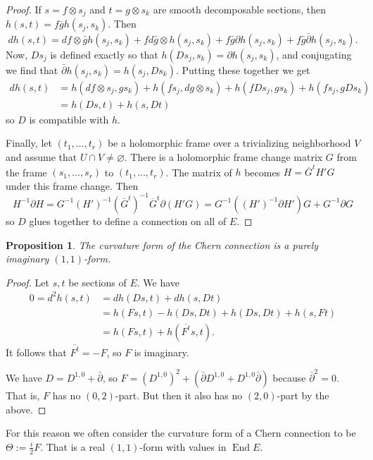 \documentclass[11pt]{article}
\newtheorem{prop}[theo]{Proposition}
\theoremstyle{definition}
\DeclareMathOperator{\End}{End}
\begin{document}
\begin{proof}
If $s = f \otimes s_j$ and $t = g \otimes s_k$ are smooth decomposable sections, then $h(s,t) = f\overline{g} h(s_j,s_k)$. Then
$$
d h(s,t)
= df \otimes \bar g h(s_j,s_k)
+ f d\bar g \otimes h(s_j,s_k)
+ f\bar g\partial h(s_j,s_k)
+ f\bar g\bar\partial h(s_j,s_k).
$$
Now, $Ds_j$ is defined exactly so that $h(Ds_j, s_k) = \partial h(s_j,s_k)$, and conjugating we find that $\bar\partial h(s_j,s_k) = h(s_j, D s_k)$. Putting these together we get
\begin{align*}
d h(s,t)
&= h(df \otimes s_j, g s_k)
+ h(f s_j, d g \otimes s_k)
+ h(f D s_j,g s_k)
+ h(f s_j,g D s_k)
\\
&= h(Ds, t) + h(s, Dt)
\end{align*}
so $D$ is compatible with $h$.

Finally, let $(t_1, \ldots, t_r)$ be a holomorphic frame over a trivializing neighborhood $V$ and assume that $U \cap V \not= \varnothing$. There is a holomorphic frame change matrix $G$ from the frame $(s_1, \ldots, s_r)$ to $(t_1,\ldots,t_r)$. The matrix of $h$ becomes $H = \overline{G}^{t}H'G$ under this frame change. Then
$$
H^{-1} \partial H
= G^{-1} (H')^{-1} (\overline G^t)^{-1} \overline G^t \partial(H'G)
= G^{-1} ((H')^{-1} \partial H') G + G^{-1} \partial G
$$
so $D$ glues together to define a connection on all of $E$.
\end{proof}


\begin{prop}
The curvature form of the Chern connection is a purely imaginary $(1,1)$-form.
\end{prop}

\begin{proof}
Let $s, t$ be sections of $E$. We have
\begin{align*}
0
= d^2 h(s, t)
&= d h(Ds, t) + d h(s, Dt)
\\
&= h(F s, t) - h(Ds, Dt) + h(Ds, Dt) + h(s, F t)
\\
&=
h(Fs,t) + h(\overline{F^{t}}s, t).
\end{align*}
It follows that $\overline{F^t} = -F$, so $F$ is imaginary.

We have $D = D^{1,0} + \bar\partial$, so $F = (D^{1,0})^2 + (\bar\partial D^{1,0} + D^{1,0}\bar\partial)$ because $\bar\partial^2 = 0$. That is, $F$ has no $(0,2)$-part. But then it also has no $(2,0)$-part by the above.
\end{proof}

For this reason we often consider the curvature form of a Chern connection to be $\Theta := \frac i2 F$. That is a real $(1,1)$-form with values in $\End E$.
\end{document}
